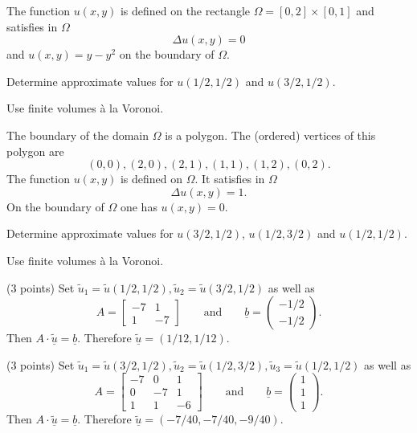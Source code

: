 \begin{teilaufgaben}
\item
The function $u(x,y)$ is defined on the rectangle
$\Omega = [0,2] \times [0,1]$
and
satisfies in $\Omega$ 
\[
\Delta u(x,y) = 0
\]
and $u(x,y) = y-y^2$ on the boundary of $\Omega$. 

Determine approximate values for $u(1/2,1/2)$ and $u(3/2,1/2)$. 

Use finite volumes \`a la Voronoi.  

\item
The boundary of the domain $\Omega$ is a polygon.
The (ordered) vertices
of this polygon are
\[
(0,0), (2,0), (2, 1), (1, 1), (1, 2), (0, 2).
\]
The function $u(x,y)$ is defined on $\Omega$.
It satisfies in $\Omega$
\[
\Delta u(x,y) = 1.
\]
On the boundary of $\Omega$ one has $u(x,y) = 0$.

Determine approximate values for $u(3/2,1/2)$, $u(1/2,3/2)$ and $u(1/2,1/2)$.

Use finite volumes \`a la Voronoi.  
\end{teilaufgaben}

\begin{loesung}
\begin{teilaufgaben}
\item
(3 points)
Set $\tilde u_1 = \tilde u(1/2,1/2), \tilde u_2 = \tilde u(3/2,1/2)$
as well as
\[
A =
\left[\begin{array}{rr} -7 & 1  \\ 1 & -7  \end{array}\right]
\qquad \text{and} \qquad
\underline{b}
=
\left(\begin{array}{r} -1/2 \\ -1/2 \end{array}\right).
\]
Then $A \cdot \underline{\tilde u} = \underline{b}$.
Therefore $\underline{\tilde u} = (1/12,1/12)$.

\item
(3 points)
Set $\tilde u_1 = \tilde u(3/2,1/2), \tilde u_2 = \tilde u(1/2,3/2),  \tilde u_3 = \tilde u(1/2,1/2)$
as well as
\[
A
=
\left[\begin{array}{rrr}
-7 & 0 & 1  \\
0 & -7 & 1 \\
1 & 1 & -6
\end{array}\right]
\qquad\text{and} \qquad
\underline{b}
=
\left(\begin{array}{r} 1 \\ 1 \\ 1 \end{array}\right).
\]
Then  $A \cdot \underline{\tilde u} = \underline{b}$.
Therefore $\underline{\tilde u} = (-7/40,-7/40,-9/40)$.
\qedhere
\end{teilaufgaben}
\end{loesung}
